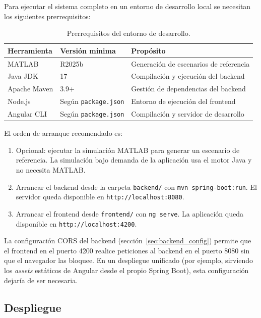 Para ejecutar el sistema completo en un entorno de desarrollo local se necesitan los
siguientes prerrequisitos:

\begin{table}[H]
\centering
\caption{Prerrequisitos del entorno de desarrollo.}
\label{tab:prereqs}
\begin{tabular}{|l|l|l|}
\hline
\textbf{Herramienta} & \textbf{Versión mínima} & \textbf{Propósito} \\
\hline
MATLAB          & R2025b  & Generación de escenarios de referencia \\
Java JDK        & 17      & Compilación y ejecución del backend \\
Apache Maven    & 3.9+    & Gestión de dependencias del backend \\
Node.js         & Según \texttt{package.json} & Entorno de ejecución del frontend \\
Angular CLI     & Según \texttt{package.json} & Compilación y servidor de desarrollo \\
\hline
\end{tabular}
\end{table}

El orden de arranque recomendado es:

\begin{enumerate}
\item Opcional: ejecutar la simulación MATLAB para generar un escenario de referencia.
  La simulación bajo demanda de la aplicación usa el motor Java y no necesita MATLAB.
\item Arrancar el backend desde la carpeta \texttt{backend/} con
  \texttt{mvn spring-boot:run}. El servidor queda disponible en
  \texttt{http://localhost:8080}.
\item Arrancar el frontend desde \texttt{frontend/} con \texttt{ng serve}. La
  aplicación queda disponible en \texttt{http://localhost:4200}.
\end{enumerate}

La configuración CORS del backend (sección~\ref{sec:backend_config}) permite que el
frontend en el puerto 4200 realice peticiones al backend en el puerto 8080 sin que
el navegador las bloquee. En un despliegue unificado (por ejemplo, sirviendo los
\textit{assets} estáticos de Angular desde el propio Spring Boot), esta configuración
dejaría de ser necesaria.

\subsection{Despliegue}
\label{sec:integracion_despliegue}

